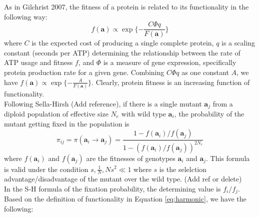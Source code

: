 \documentclass[13pt]{article}
\begin{document}
As in Gilchrist 2007, the fitness of a protein is related to its functionality in the following way:
\[f(\mathbf{a}) \propto \exp\{-\frac{C\Phi q}{F(\mathbf{a})}\}\]
where $C$ is the expected cost of producing a single complete protein, $q$ is a scaling constant (seconds per ATP) determining the relationship between the rate of ATP usage and fitness $f$, and $\Phi$ is a measure of gene expression, specifically protein production rate for a given gene.
Combining $C\Phi q$ as one constant $A$, we have
$f(\mathbf{a}) \propto \exp\{-\frac{A}{F(\mathbf{a})}\}$.
Clearly, protein fitness is an increasing function of functionality.\\

Following Sella-Hirsh (Add reference), if there is a single mutant $\mathbf{a}_j$ from a diploid population of effective size $N_e$ with wild type $\mathbf{a}_i$, the probability of the mutant getting fixed in the population is 
\begin{equation}
\pi_{ij} = \pi(\mathbf{a}_i \rightarrow \mathbf{a}_j ) = \frac{1-f(\mathbf{a}_i)/f(\mathbf{a}_j)}{1-(f(\mathbf{a}_i)/f(\mathbf{a}_j))^{2N_e}}
\label{eq:fixation}
\end{equation}
where $f(\mathbf{a}_i)$ and $f(\mathbf{a}_j)$ are the fitnesses of genotypes $\mathbf{a}_i$ and $\mathbf{a}_j$. This formula is valid under the condition $s, \frac{1}{N}, Ns^2 \ll 1$ where $s$ is the selelction advantage/disadvantage of the mutant over the wild type. (Add ref or delete)\\

%
%




In the S-H formula of the fixation probability, the determining value is $f_i/f_j$.
Based on the definition of functionality in Equation \ref{eq:harmonic}, we have the following:
\end{document}
